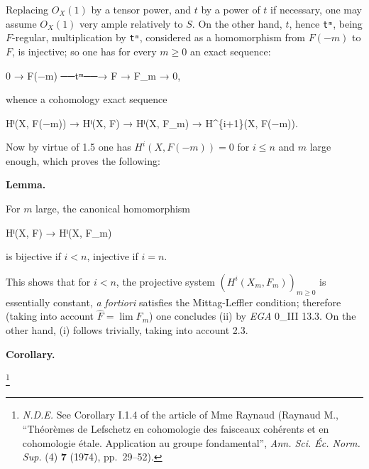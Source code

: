 \documentclass[
]{article}
\newenvironment{Shaded}{}{}
\newcommand{\NormalTok}[1]{#1}
\begin{document}
Replacing \(O_{X}(1)\) by a tensor power, and \(t\) by a power of \(t\)
if necessary, one may assume \(O_{X}(1)\) very ample relatively to
\(S\). On the other hand, \(t\), hence \texttt{tᵐ}, being \(F\)-regular,
multiplication by \texttt{tᵐ}, considered as a homomorphism from
\(F(-m)\) to \(F\), is injective; so one has for every \(m \geqslant 0\)
an exact sequence:

\begin{Shaded}
\begin{Highlighting}[]
\NormalTok{0 → F(−m) ──tᵐ──→ F → F\_m → 0,}
\end{Highlighting}
\end{Shaded}

whence a cohomology exact sequence

\begin{Shaded}
\begin{Highlighting}[]
\NormalTok{Hⁱ(X, F(−m)) → Hⁱ(X, F) → Hⁱ(X, F\_m) → H\^{}\{i+1\}(X, F(−m)).}
\end{Highlighting}
\end{Shaded}

Now by virtue of 1.5 one has \(H^{i}(X, F(-m)) = 0\) for
\(i \leqslant n\) and \(m\) large enough, which proves the following:

\textbf{Lemma.}

For \(m\) large, the canonical homomorphism

\begin{Shaded}
\begin{Highlighting}[]
\NormalTok{Hⁱ(X, F) → Hⁱ(X, F\_m)}
\end{Highlighting}
\end{Shaded}

is bijective if \(i < n\), injective if \(i = n\).

This shows that for \(i < n\), the projective system
\((H^{i}(X_{m}, F_{m}))_{m\geqslant 0}\) is essentially constant,
\emph{a fortiori} satisfies the Mittag-Leffler condition; therefore
(taking into account \(\hat{F} = \lim F_{m}\)) one concludes (ii) by
\emph{EGA} 0\_III 13.3. On the other hand, (i) follows trivially, taking
into account 2.3.

\textbf{Corollary.}

\footnote{\emph{N.D.E.} See Corollary I.1.4 of the article of Mme
  Raynaud (Raynaud M., ``Théorèmes de Lefschetz en cohomologie des
  faisceaux cohérents et en cohomologie étale. Application au groupe
  fondamental'', \emph{Ann. Sci. Éc. Norm. Sup.} (4) \textbf{7} (1974),
  pp.~29--52).}
\end{document}

